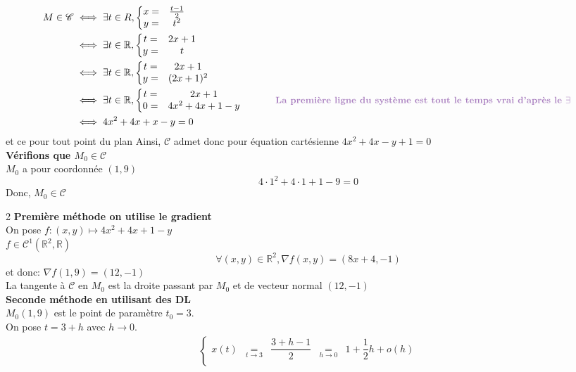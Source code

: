 \documentclass{article}
\newcommand{\R}[0]{
\mathbb{R}
}
\newcommand{\But}[1]{
\textbf{\textcolor{mypurple}{#1}}
}
\begin{document}
{{\begin{align*}
M \in \mathscr{C}&\iff \exists t \in R, \left\{\begin{matrix}x=&\frac{t-1}{2}\\y=&t^2\end{matrix}\right.\\
&\iff \exists t \in \R, \left\{\begin{matrix}t=&2x+1\\ y=&t\end{matrix}\right.\\
&\iff \exists t \in \R, \left\{\begin{matrix}t=&2x+1\\ y=&(2x+1)^2\end{matrix}\right.\\
&\iff \exists t \in \R, \left\{\begin{matrix}t=&2x+1\\ 0=&4x^2+4x+1-y\end{matrix}\right. \hspace{30pt} \text{\But{{\small La première ligne du système est tout le temps vrai d'après le $\exists$}}}\\
&\iff 4x^2+4x+x-y=0
\end{align*}
}{et ce pour tout point du plan}
Ainsi, $\mathscr{C}$ admet donc pour équation cartésienne $4x^2+4x-y+1=0$\\
\But{Vérifions que $M_0 \in \mathscr{C}$}\\
$M_0$ a pour coordonnée $(1,9)$\\
$$4\cdot 1^2+4\cdot 1 + 1 - 9=0$$
Donc, $M_0 \in \mathscr{C}$
\begin{multicols}{2}
\noindent\But{Première méthode on utilise le gradient}\\
On pose $f:(x,y) \mapsto 4x^2+4x+1-y$\\
$f \in \mathcal{C}^1(\R^2,\R)$
$$\forall (x,y)\in \R^2, \nabla f(x,y)=(8x+4,-1)$$
et donc: $\nabla f(1,9)=(12,-1)$\\
La tangente à $\mathscr C$ en $M_0$ est la droite passant par $M_0$ et de vecteur normal $(12,-1)$\columnbreak\\
\But{Seconde méthode en utilisant des DL}\\
$M_0(1,9)$ est le point de paramètre $t_0=3$.\\
On pose $t = 3+h$ avec $h \to 0$.
\begin{align*}
\left\{\begin{matrix}
x(t)&\underset{t\to 3}{=}&\dfrac{3+h-1}{2} &\underset{h\to 0}{=}& 1 + \dfrac{1}{2}h + o(h)\\[10pt]

\end{matrix}
\end{align*}
\end{multicols}}
\end{document}
